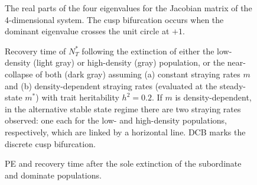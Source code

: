 \documentclass{revtex4}
\begin{document}
% 


\begin{figure}
  \captionsetup{justification=raggedright,
singlelinecheck=false
}
\centering
\caption{
The real parts of the four eigenvalues for the Jacobian matrix of the 4-dimensional system.
The cusp bifurcation occurs when the dominant eigenvalue crosses the unit circle at $+1$. 
} \label{fig:eigs}
\end{figure}



\begin{figure}
  \captionsetup{justification=raggedright,
singlelinecheck=false
}
\centering
\caption{
Recovery time of $N_T^*$ following the extinction of either the low-density (light gray) or high-density (gray) population, or the near-collapse of both (dark gray) assuming (a) constant straying rates $m$ and (b) density-dependent straying rates (evaluated at the steady-state $m^*$) with trait heritability $h^2=0.2$.
If $m$ is density-dependent, in the alternative stable state regime there are two straying rates observed: one each for the low- and high-density populations, respectively, which are linked by a horizontal line.
DCB marks the discrete cusp bifurcation.
} \label{fig:relax}
\end{figure}

\begin{figure}
  \captionsetup{justification=raggedright,
singlelinecheck=false
}
\centering
\caption{
PE and recovery time after the sole extinction of the subordinate and dominate populations.
} \label{fig:pertlh}
\end{figure}
\end{document}
